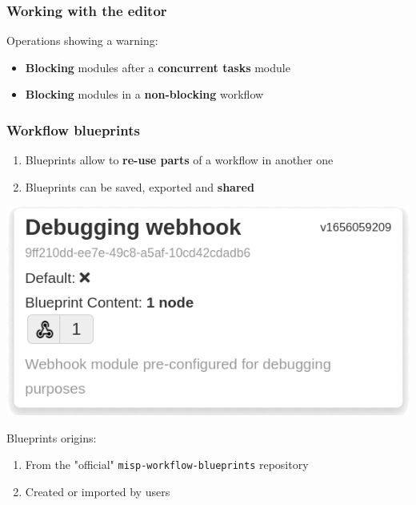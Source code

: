 \begin{frame}
    \frametitle{Working with the editor}
    Operations showing a warning:
    \begin{itemize}
        \item \textbf{Blocking} modules after a \textbf{concurrent tasks} module
        \item \textbf{Blocking} modules in a \textbf{non-blocking} workflow
    \end{itemize}
    \begin{center}
    \end{center}
\end{frame}

\begin{frame}
    \frametitle{Workflow blueprints}
    \begin{enumerate}
        \item Blueprints allow to \textbf{re-use parts} of a workflow in another one
        \item Blueprints can be saved, exported and \textbf{shared}
    \end{enumerate}
    \begin{center}
        \includegraphics[width=0.5\linewidth]{pictures/blueprint-debugging.png}
    \end{center}
    Blueprints origins:
    \begin{enumerate}
        \item From the "official" \texttt{misp-workflow-blueprints} repository
        \item Created or imported by users
    \end{enumerate}
\end{frame}

